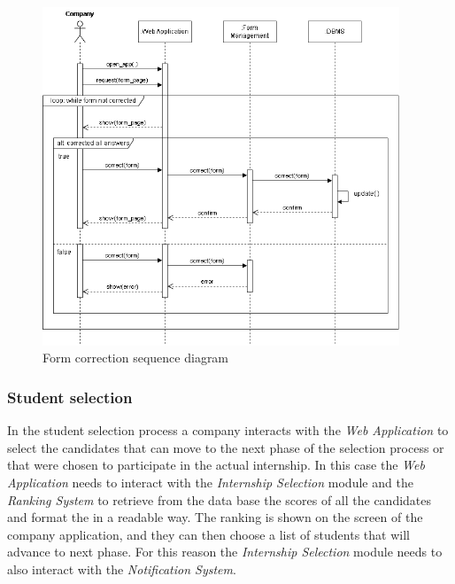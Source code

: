 \documentclass[11pt,twoside]{article}
\begin{document}
\begin{figure}[H]
\centering
\includegraphics[width=0.95\textwidth]{Images/Seq7}
\caption{Form correction sequence diagram}\label{Seq7}
\end{figure}

\newpage

		\subsubsection{Student selection}
In the student selection process a company interacts with the \textit{Web Application} to select the candidates that can move to the next phase of the selection process or that were chosen to participate in the actual internship. In this case the \textit{Web Application} needs to interact with the \textit{Internship Selection} module and the \textit{Ranking System} to retrieve from the data base the scores of all the candidates and format the in a readable way. The ranking is shown on the screen of the company application, and they can then choose a list of students that will advance to next phase. For this reason the \textit{Internship Selection} module needs to also interact with the \textit{Notification System}.
\end{document}
